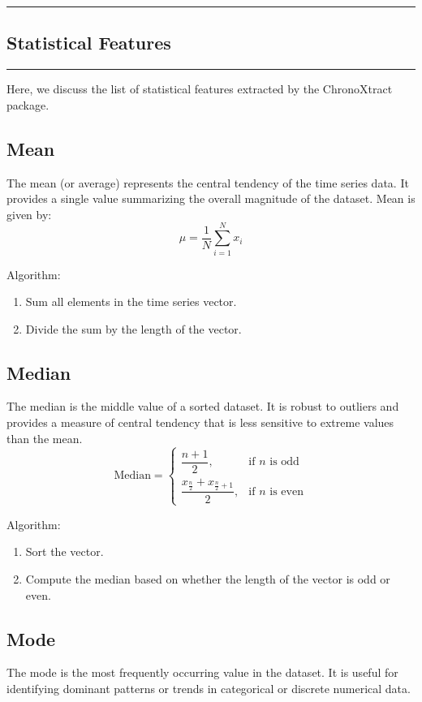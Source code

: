 {\color{gray}\hrule}
\begin{center}
\section{Statistical Features}
\bigskip
\end{center}
{\color{gray}\hrule}
Here, we discuss the list of statistical features extracted by the ChronoXtract package. 
\subsection{Mean}
The mean (or average) represents the central tendency of the time series data. It provides a single value summarizing the overall magnitude of the dataset. Mean is given by: 
\begin{equation}
    \mu = \frac{1}{N} \sum_{i=1}^{N} x_i
    \label{eq:mean}
\end{equation}

Algorithm:
\begin{enumerate}
    \item Sum all elements in the time series vector.
    \item Divide the sum by the length of the vector.
\end{enumerate}


\subsection{Median}
The median is the middle value of a sorted dataset. It is robust to outliers and provides a measure of central tendency that is less sensitive to extreme values than the mean.
\begin{equation}
   \text{Median} =
   \begin{cases} 
   \dfrac{n+1}{2}, & \text{if } n \text{ is odd} \\ 
   \dfrac{x_{\frac{n}{2}} + x_{\frac{n}{2} + 1}}{2}, & \text{if } n \text{ is even}
   \end{cases}
   \label{eq:median_expression}
\end{equation}

Algorithm:
\begin{enumerate}
    \item Sort the vector.
    \item Compute the median based on whether the length of the vector is odd or even.
\end{enumerate}

\subsection{Mode}
The mode is the most frequently occurring value in the dataset. It is useful for identifying dominant patterns or trends in categorical or discrete numerical data.

\begin{equation}
    
\end{equation}


